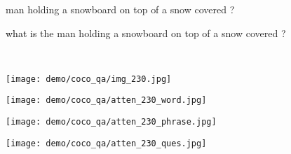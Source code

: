 \documentclass{article}
\def \fsize {1pt}
\begin{document}
\begin{figure}[tb]
\begin{minipage}{0.22\linewidth}
\begin{center}
{\textcolor[rgb]{0.0000,0.4098,1.0000}{man}
\textcolor[rgb]{0.0000,0.6608,1.0000}{holding}
\textcolor[rgb]{0.0000,0.4725,1.0000}{a}
\textcolor[rgb]{0.0000,0.8333,1.0000}{snowboard}
\textcolor[rgb]{0.0000,0.7078,1.0000}{on}
\textcolor[rgb]{0.0000,0.6294,1.0000}{top}
\textcolor[rgb]{0.0000,0.4412,1.0000}{of}
\textcolor[rgb]{0.0000,0.3784,1.0000}{a}
\textcolor[rgb]{0.0000,0.6608,1.0000}{snow}
\textcolor[rgb]{0.0095,0.9118,0.9583}{covered}
\textcolor[rgb]{0.0000,0.4725,1.0000}{?}
}
\end{center}
\end{minipage}
\begin{minipage}{0.22\linewidth}
\begin{center}
\tiny{\textcolor{black}{
\setlength{\fboxsep}{\fsize}
\textcolor[rgb]{0.0000,0.6294,1.0000}{what}
\textcolor[rgb]{0.0000,0.6137,1.0000}{is}}
\textcolor[rgb]{0.0000,0.5353,1.0000}{the}
\textcolor[rgb]{0.0000,0.4569,1.0000}{man}
\textcolor[rgb]{0.0000,0.5510,1.0000}{holding}
\textcolor[rgb]{0.0000,0.4725,1.0000}{a}
\textcolor[rgb]{0.0000,0.5510,1.0000}{snowboard}
\textcolor[rgb]{0.0000,0.5510,1.0000}{on}
\textcolor[rgb]{0.0000,0.5667,1.0000}{top}
\textcolor[rgb]{0.0000,0.5824,1.0000}{of}
\textcolor[rgb]{0.0000,0.5980,1.0000}{a}
\textcolor[rgb]{0.0000,0.5824,1.0000}{snow}
\textcolor[rgb]{0.0000,0.5510,1.0000}{covered}
\textcolor[rgb]{0.0000,0.6294,1.0000}{?}
}
\end{center}
\end{minipage}
\\
\begin{minipage}{0.22\linewidth}
\texttt{[image: demo/coco\_qa/img\_230.jpg]}
\end{minipage}
\begin{minipage}{0.22\linewidth}
\texttt{[image: demo/coco\_qa/atten\_230\_word.jpg]}
\end{minipage}
\begin{minipage}{0.22\linewidth}
\texttt{[image: demo/coco\_qa/atten\_230\_phrase.jpg]}
\end{minipage}
\begin{minipage}{0.22\linewidth}
\texttt{[image: demo/coco\_qa/atten\_230\_ques.jpg]}
\end{minipage}
\\

\end{figure}
\end{document}
